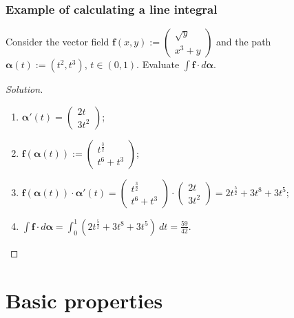 \documentclass[aspectratio=169,handout]{beamer}
\newcommand{\ff}{\mathbf{f}}
\newcommand{\aalpha}{\boldsymbol{\alpha}}
\begin{document}
\begin{frame}
    \frametitle{Example of calculating a line integral}


    \begin{example}
        Consider the vector field \(\ff(x,y) := \begin{pmatrix}
            \sqrt y \\ x^3 + y
        \end{pmatrix}\)
        and the path
        \(\aalpha(t):= (t^2,t^3)\), \(t \in (0,1)\).
        Evaluate \(\int \ff \cdot d\aalpha\).
    \end{example}
    \begin{proof}[Solution]
        \begin{enumerate}
            \item \(\aalpha'(t) = \begin{pmatrix}
                      2t \\ 3t^2
                  \end{pmatrix}\);
            \item \(\ff(\aalpha(t)) := \begin{pmatrix}
                      t^{\frac{3}{2}} \\ t^6 + t^3
                  \end{pmatrix}\);
            \item \( \ff(\aalpha(t)) \cdot  \aalpha'(t) = \begin{pmatrix}
                      t^{\frac{3}{2}} \\ t^6 + t^3
                  \end{pmatrix} \cdot  \begin{pmatrix}
                      2t \\ 3t^2
                  \end{pmatrix} = 2 t^{\frac{5}{2}} + 3t^8 + 3t^5\);
            \item
                  \(
                  \displaystyle\int \ff \cdot d\aalpha = \displaystyle\int_{0}^{1} (2 t^{\frac{5}{2}} + 3t^8 + 3t^5 ) \ dt = \frac{59}{42}.
                  \) \qedhere
        \end{enumerate}
    \end{proof}
\end{frame}

\section{Basic properties}
\end{document}
